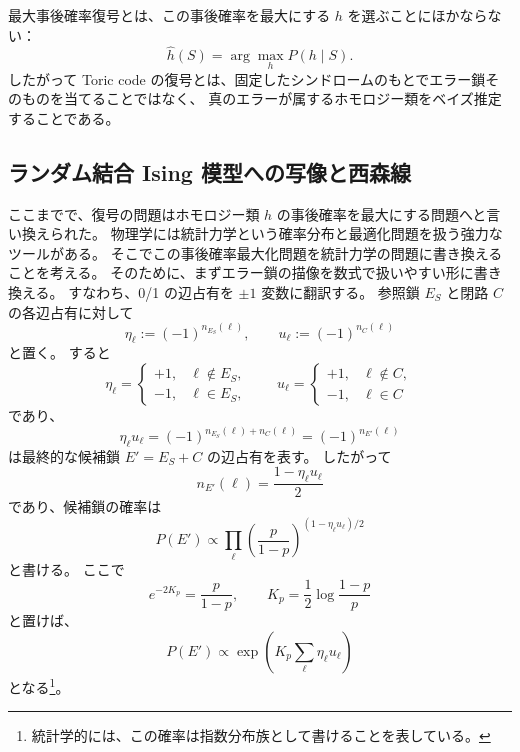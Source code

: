 \documentclass[../master.tex]{subfiles}
\begin{document}
最大事後確率復号とは、この事後確率を最大にする \(h\) を選ぶことにほかならない：
\begin{equation}
    \hat h(S)=\arg\max_h P(h\mid S).
\end{equation}
したがって Toric code の復号とは、固定したシンドロームのもとでエラー鎖そのものを当てることではなく、
真のエラーが属するホモロジー類をベイズ推定することである。


\subsection*{ランダム結合 Ising 模型への写像と西森線}

ここまでで、復号の問題はホモロジー類 \(h\) の事後確率を最大にする問題へと言い換えられた。
物理学には統計力学という確率分布と最適化問題を扱う強力なツールがある。
そこでこの事後確率最大化問題を統計力学の問題に書き換えることを考える。
そのために、まずエラー鎖の描像を数式で扱いやすい形に書き換える。
すなわち、0/1 の辺占有を \(\pm1\) 変数に翻訳する。
参照鎖 \(E_S\) と閉路 \(C\) の各辺占有に対して
\begin{equation}
    \eta_\ell:=(-1)^{n_{E_S}(\ell)},
    \qquad
    u_\ell:=(-1)^{n_C(\ell)}
\end{equation}
と置く。
すると
\begin{equation}
    \eta_\ell=
    \begin{cases}
    +1,& \ell\notin E_S,\\
    -1,& \ell\in E_S,
    \end{cases}
    \qquad
    u_\ell=
    \begin{cases}
    +1,& \ell\notin C,\\
    -1,& \ell\in C
    \end{cases}
\end{equation}
であり、
\begin{equation}
    \eta_\ell u_\ell=(-1)^{n_{E_S}(\ell)+n_C(\ell)}=(-1)^{n_{E'}(\ell)}
\end{equation}
は最終的な候補鎖 \(E'=E_S+C\) の辺占有を表す。
したがって
\begin{equation}
    n_{E'}(\ell)=\frac{1-\eta_\ell u_\ell}{2}
\end{equation}
であり、候補鎖の確率は
\begin{equation}
    P(E')
    \propto
    \prod_\ell
    \left(\frac{p}{1-p}\right)^{(1-\eta_\ell u_\ell)/2}
\end{equation}
と書ける。
ここで
\begin{equation}
    e^{-2K_p}=\frac{p}{1-p},
    \qquad
    K_p=\frac{1}{2}\log\frac{1-p}{p}
\end{equation}
と置けば、
\begin{equation}
    P(E') \propto \exp(K_p\sum_\ell \eta_\ell u_\ell)
    \label{eq:chap4_candidate_chain_decomposition}
\end{equation}
となる\footnote{統計学的には、この確率は指数分布族として書けることを表している。}。
\end{document}
